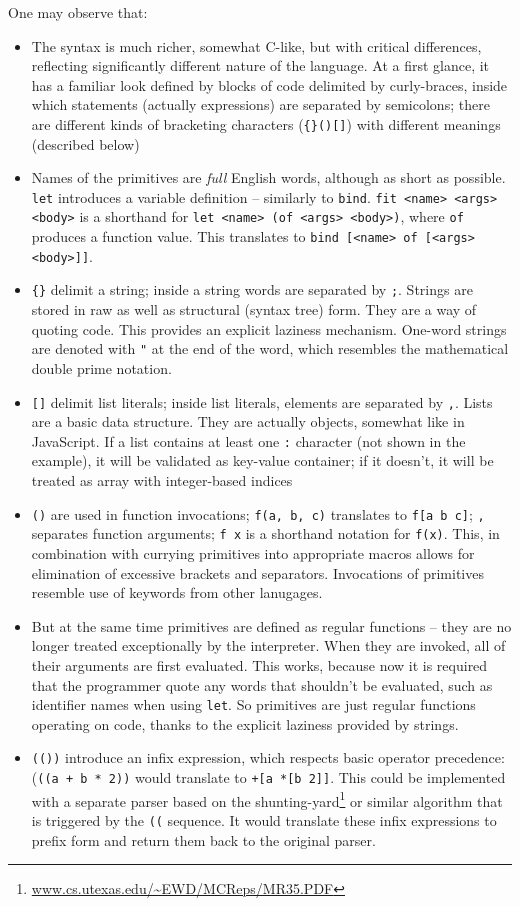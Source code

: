 One may observe that:
\begin{itemize}
    \item The syntax is much richer, somewhat C-like, but with critical differences, reflecting significantly different nature of the language. At a first glance, it has a familiar look defined by blocks of code delimited by curly-braces, inside which statements (actually expressions) are separated by semicolons; there are different kinds of bracketing characters (\texttt{\{\}()[]}) with different meanings (described below)
    \item Names of the primitives are \textit{full} English words, although as short as possible. \texttt{let} introduces a variable definition -- similarly to \texttt{bind}. \texttt{fit <name> <args> <body>} is a shorthand for \texttt{let <name> (of <args> <body>)}, where \texttt{of} produces a function value. This translates to \texttt{bind [<name> of [<args> <body>]]}.
    \item \texttt{\{\}} delimit a string; inside a string words are separated by \texttt{;}. Strings are stored in raw as well as structural (syntax tree) form. They are a way of quoting code. This provides an explicit laziness mechanism. One-word strings are denoted with \texttt{"} at the end of the word, which resembles the mathematical double prime notation.
    \item \texttt{[]} delimit list literals; inside list literals, elements are separated by \texttt{,}. Lists are a basic data structure. They are actually objects, somewhat like in JavaScript. If a list contains at least one \texttt{:} character (not shown in the example), it will be validated as key-value container; if it doesn't, it will be treated as array with integer-based indices
    \item \texttt{()} are used in function invocations; \texttt{f(a, b, c)} translates to \texttt{f[a b c]}; \texttt{,} separates function arguments; \texttt{f x} is a shorthand notation for \texttt{f(x)}. This, in combination with currying primitives into appropriate macros allows for elimination of excessive brackets and separators. Invocations of primitives resemble use of keywords from other lanugages. 
    \item But at the same time primitives are defined as regular functions -- they are no longer treated exceptionally by the interpreter. When they are invoked, all of their arguments are first evaluated. This works, because now it is required that the programmer quote any words that shouldn't be evaluated, such as identifier names when using \texttt{let}. So primitives are just regular functions operating on code, thanks to the explicit laziness provided by strings.
    \item \texttt{(())} introduce an infix expression, which respects basic operator precedence: (\texttt{((a + b * 2))} would translate to \texttt{+[a *[b 2]]}. This could be implemented with a separate parser based on the shunting-yard\footnote{\url{www.cs.utexas.edu/~EWD/MCReps/MR35.PDF}} or similar algorithm that is triggered by the \texttt{((} sequence. It would translate these infix expressions to prefix form and return them back to the original parser.
\end{itemize}

